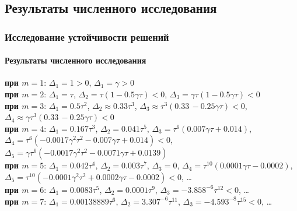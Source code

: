 \documentclass{beamer}
\numberwithin{equation}{section}
\begin{document}
    \subsection{Результаты численного исследования}
    \begin{frame}
        \frametitle{Исследование устойчивости решений}
        \framesubtitle{Результаты численного исследования}

        \begin{small}

        \textbf{при $m=1$}: $\Delta_1 = 1 > 0$, $\Delta_1 = \gamma > 0$\\

        \textbf{при $m=2$}: $\Delta_1 = \tau$, $\Delta_2 = \tau (1 - 0.5 \gamma \tau) < 0$, $\Delta_3 = \gamma \tau (1 - 0.5 \gamma \tau) < 0$\\

        \textbf{при $m=3$}: $\Delta_1 = 0.5 \tau ^2$, $\Delta_2 \approx 0.33 \tau ^3$, $\Delta_3 \approx \tau ^3 (0.33\, -0.25 \gamma  \tau ) < 0$, $\Delta_4 \approx \gamma  \tau ^3 (0.33\, -0.25 \gamma  \tau ) < 0$\\

        \textbf{при $m=4$}: $\Delta_1 = 0.167 \tau ^3$, $\Delta_2 = 0.041 \tau ^5$, $\Delta_3 = \tau ^6 (0.007 \gamma  \tau + 0.014)$, \\$\Delta_4 = \tau ^6 \left(-0.0017 \gamma ^2 \tau ^2-0.007 \gamma  \tau +0.014\right) < 0$, $\Delta_5 = \gamma  \tau ^6 \left(-0.0017 \gamma ^2 \tau ^2-0.0071 \gamma  \tau +0.0139 \right)$\\

        \textbf{при $m=5$}: $\Delta_1 = 0.042 \tau ^4$, $\Delta_2 = 0.003 \tau ^7$, $\Delta_3 = 0$, $\Delta_4 = \tau ^{10} (0.0001 \gamma  \tau -0.0002)$, $\Delta_5 = \tau ^{10} \left(-0.0001 \gamma ^2 \tau ^2+0.0002 \gamma  \tau -0.0002\right) < 0$, \dots\\

        \textbf{при $m=6$}: $\Delta_1 = 0.0083 \tau ^5$, $\Delta_2 = 0.0001 \tau ^9$, $\Delta_3 = -3.858^{-6} \tau ^{12} < 0$, \dots\\

        \textbf{при $m=7$}: $\Delta_1 = 0.00138889 \tau ^6$, $\Delta_2 = 3.307^{-6} \tau ^{11}$, $\Delta_3 = -4.593^{-8} \tau ^{15} < 0$, \dots\\

        \end{small}

    \end{frame}
\end{document}

